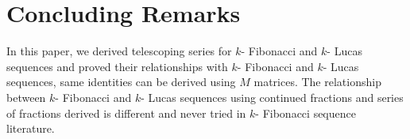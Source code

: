  \section{Concluding Remarks}
In this paper, we derived telescoping series for $k$- Fibonacci and $k$- Lucas sequences and proved their relationships with $k$- Fibonacci and $k$- Lucas sequences, same identities can be derived using $M$ matrices.
 The relationship between $k$- Fibonacci and $k$- Lucas sequences using continued fractions and series of fractions derived is different and never tried in $k$- Fibonacci sequence literature.

